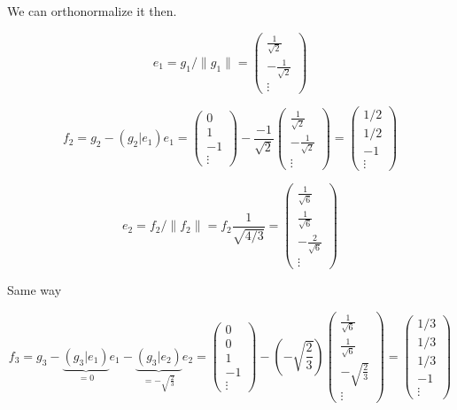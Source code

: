 \documentclass{article}
\begin{document}
We can orthonormalize it then.

$$e_1 = g_1 / \|g_1\| =
\begin{pmatrix}\frac{1}{\sqrt2} \\ - \frac{1}{\sqrt2} \\ \vdots \end{pmatrix}$$

$$f_2 = g_2 - \left(g_2|e_1\right)e_1 =
\begin{pmatrix}0\\ 1\\ -1\\ \vdots\end{pmatrix}
-
\frac{-1}{\sqrt2} \begin{pmatrix}\frac{1}{\sqrt2} \\ - \frac{1}{\sqrt2} \\ \vdots \end{pmatrix}
= \begin{pmatrix} 1/2 \\ 1/2 \\ -1 \\ \vdots \end{pmatrix}$$

$$e_2 = f_2/\|f_2\| =
f_2 \frac{1}{\sqrt{4/3}} =
\begin{pmatrix} \frac1{\sqrt6} \\ \frac1{\sqrt6} \\ - \frac2{\sqrt6} \\ \vdots \end{pmatrix}$$

Same way

$$f_3 =
g_3 - \underbrace{\left(g_3|e_1\right)}_{=0}e_1
    - \underbrace{\left(g_3|e_2\right)}_{=-\sqrt{\frac23}}e_2
= \begin{pmatrix}0 \\ 0 \\ 1 \\ -1 \\ \vdots\end{pmatrix}
    - (-\sqrt{\frac23}) \begin{pmatrix} \frac1{\sqrt6} \\ \frac1{\sqrt6} \\ - \sqrt{\frac23} \\ \vdots \end{pmatrix}
= \begin{pmatrix} 1/3 \\ 1/3 \\ 1/3 \\ -1 \\ \vdots \end{pmatrix}$$
\end{document}
